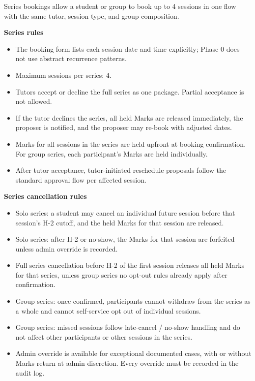 \documentclass[11pt,a4paper]{article}
\begin{document}
Series bookings allow a student or group to book up to 4 sessions in one flow with the same tutor, session type, and group composition.

\textbf{Series rules}
\begin{itemize}
    \item The booking form lists each session date and time explicitly; Phase 0 does not use abstract recurrence patterns.
    \item Maximum sessions per series: 4.
    \item Tutors accept or decline the full series as one package. Partial acceptance is not allowed.
    \item If the tutor declines the series, all held Marks are released immediately, the proposer is notified, and the proposer may re-book with adjusted dates.
    \item Marks for all sessions in the series are held upfront at booking confirmation. For group series, each participant's Marks are held individually.
    \item After tutor acceptance, tutor-initiated reschedule proposals follow the standard approval flow per affected session.
\end{itemize}

\textbf{Series cancellation rules}
\begin{itemize}
    \item Solo series: a student may cancel an individual future session before that session's H-2 cutoff, and the held Marks for that session are released.
    \item Solo series: after H-2 or no-show, the Marks for that session are forfeited unless admin override is recorded.
    \item Full series cancellation before H-2 of the first session releases all held Marks for that series, unless group series no opt-out rules already apply after confirmation.
    \item Group series: once confirmed, participants cannot withdraw from the series as a whole and cannot self-service opt out of individual sessions.
    \item Group series: missed sessions follow late-cancel / no-show handling and do not affect other participants or other sessions in the series.
    \item Admin override is available for exceptional documented cases, with or without Marks return at admin discretion. Every override must be recorded in the audit log.
\end{itemize}
\end{document}
